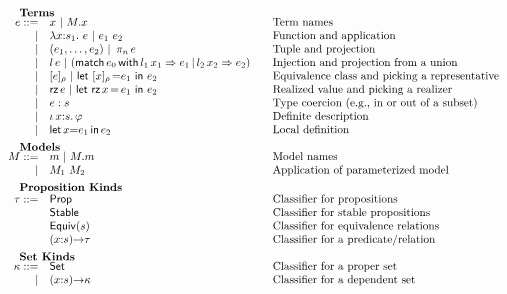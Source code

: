\begin{figure}
\[\begin{array}{rl@{\qquad}l}
		\noalign{\textbf{Terms}}	
		\ie ::=
		    & \ix\ |\ \iselect{\im}{\ix} &\mbox{Term names}\\
		  | & \ilambda{\ix}{\is_1}{\ie}\ |\ 
		      \iapp{\ie_1}{\ie_2} &\mbox{Function and application}\\
		  | & \ituple{\ie_1}{\ie_2} 
		      \ibar \iproj{\ie}{n}&\mbox{Tuple and projection}\\
		  | & \iinj{\il}{\ie} 
		      \ibar (\imatch{\ie_0}{\il_1}{\ix_1}{\ie_1}{\il_2}{\ix_2}{\ie_2})&\mbox{Injection and projection from a union}\\
		  | & \ieclass{\ie}{\ipp}
		      \ibar \ileteclass{\ix}{\ipp}{\ie_1}{\ie_2}&\mbox{Equivalence class and picking a representative}\\
		  | & \irz{\ie}
		      \ibar \iletrz{\ix}{\ie_1}{\ie_2}&\mbox{Realized value and picking a realizer}\\
		  | & \iconstrain{\ie}{\is}&\mbox{Type coercion (e.g., in or out of a subset)}\\
		  | & \ithe{\ix}{\is}{\ip}&\mbox{Definite description}\\
		  | & \ilet{\ix}{\ie_1}{\ie_2}&\mbox{Local definition}\\[5pt]
		
		\noalign{\textbf{Models}}		
		\im ::= 
		    & \iM \ |\ \iselect{\im}{\iM}&\mbox{Model names}\\
		  | & \iapp{\im_1}{\im_2}&\mbox{Application of parameterized model}\\[5pt]
		
		\noalign{\textbf{Proposition Kinds}}
		\ipt ::=
		    & \iProp & \mbox{Classifier for propositions}\\
		    & \iStable & \mbox{Classifier for stable propositions}\\
		    & \iEquiv{\is} &\mbox{Classifier for equivalence relations}\\
		    & \idarrow{\ix}{\is}{\ipt} & \mbox{Classifier for a predicate/relation}\\[5pt] 
		
		\noalign{\textbf{Set Kinds}}
		\ik ::= 
		    & \iSet &\mbox{Classifier for a proper set}\\
		   | & \idarrow{\ix}{\is}{\ik} &\mbox{Classifier for a dependent set}\\[5pt]
		


\end{array}\]
\end{figure}
